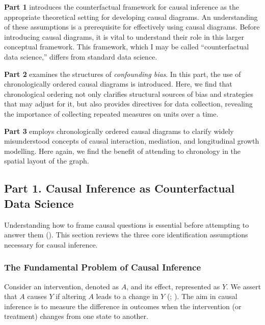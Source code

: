 \documentclass[
  singlecolumn,
  9pt]{article}
\begin{document}
\textbf{Part 1} introduces the counterfactual framework for causal
inference as the appropriate theoretical setting for developing causal
diagrams. An understanding of these assumptions is a prerequisite for
effectively using causal diagrams. Before introducing causal diagrams,
it is vital to understand their role in this larger conceptual
framework. This framework, which I may be called ``counterfactual data
science,'' differs from standard data science.

\textbf{Part 2} examines the structures of \emph{confounding bias}. In
this part, the use of chronologically ordered causal diagrams is
introduced. Here, we find that chronological ordering not only clarifies
structural sources of bias and strategies that may adjust for it, but
also provides directives for data collection, revealing the importance
of collecting repeated measures on units over a time.

\textbf{Part 3} employs chronologically ordered causal diagrams to
clarify widely misunderstood concepts of causal interaction, mediation,
and longitudinal growth modelling. Here again, we find the benefit of
attending to chronology in the spatial layout of the graph.

\subsection{Part 1. Causal Inference as Counterfactual Data
Science}\label{part-1.-causal-inference-as-counterfactual-data-science}

Understanding how to frame causal questions is essential before
attempting to answer them (). This section reviews the three core identification
assumptions necessary for causal inference.

\subsubsection{The Fundamental Problem of Causal
Inference}\label{the-fundamental-problem-of-causal-inference}

Consider an intervention, denoted as \(A\), and its effect, represented
as \(Y\). We assert that \(A\) causes \(Y\) if altering \(A\) leads to a
change in \(Y\) (;
). The aim in causal inference is to
measure the difference in outcomes when the intervention (or treatment)
changes from one state to another.
\end{document}

